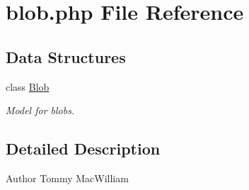 \hypertarget{blob_8php}{
\section{blob.php File Reference}
\label{blob_8php}
}
\subsection*{Data Structures}
\begin{DoxyCompactItemize}
\item 
class \hyperlink{class_blob}{Blob}
\begin{DoxyCompactList}\small\item\em Model for blobs. \item\end{DoxyCompactList}\end{DoxyCompactItemize}


\subsection{Detailed Description}
\begin{DoxyAuthor}{Author}
Tommy MacWilliam 
\end{DoxyAuthor}
